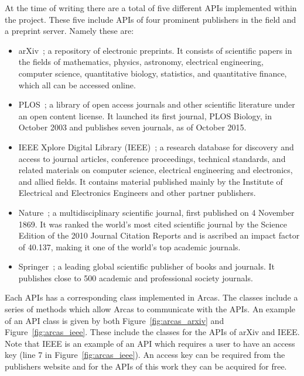 At the time of writing there are a total of five different APIs implemented within the project. These
five include APIs of four prominent publishers in the field and a preprint
server. Namely these are:

\begin{multicols}{2}
    \begin{itemize}
        \item arXiv~\cite{mckiernan2000}; a repository of electronic preprints.
        It consists of scientific
        papers in the fields of mathematics, physics, astronomy, electrical engineering,
        computer science, quantitative biology, statistics, and quantitative finance,
        which all can be accessed online.
        \item PLOS~\cite{plos}; a library of open access journals and other scientific literature
        under an open content license. It launched its first journal, PLOS Biology,
        in October 2003 and publishes seven journals, as of October 2015.
        \item IEEE Xplore Digital Library (IEEE)~\cite{ieee}; a research database for discovery
        and access to journal articles, conference proceedings, technical standards,
        and related materials on computer science, electrical engineering and electronics,
        and allied fields. It contains material published mainly by the Institute of
        Electrical and Electronics Engineers and other partner publishers. 
        \item Nature~\cite{nature}; a multidisciplinary scientific journal,
        first published on 4 November 1869. It was ranked the world's most cited
        scientific journal by the Science Edition of the 2010 Journal Citation Reports
        and is ascribed an impact factor of 40.137, making it one of the world's
        top academic journals.
        \item Springer~\cite{springer}; a leading global scientific publisher of
        books and journals. It publishes close to 500 academic and professional
        society journals.
    \end{itemize}
\end{multicols}

Each APIs has a corresponding class implemented in Arcas. The classes include
a series of methods which allow Arcas to communicate with the APIs. An example
of an API class is given by both Figure~\ref{fig:arcas_arxiv} and Figure~\ref{fig:arcas_ieee}.
These include the classes for the APIs of arXiv and IEEE. Note that IEEE is
an example of an API which requires a user to have an access key
(line 7 in Figure~\ref{fig:arcas_ieee}). An access key can be required from the
publishers website and for the APIs of this work they can be acquired for free.

